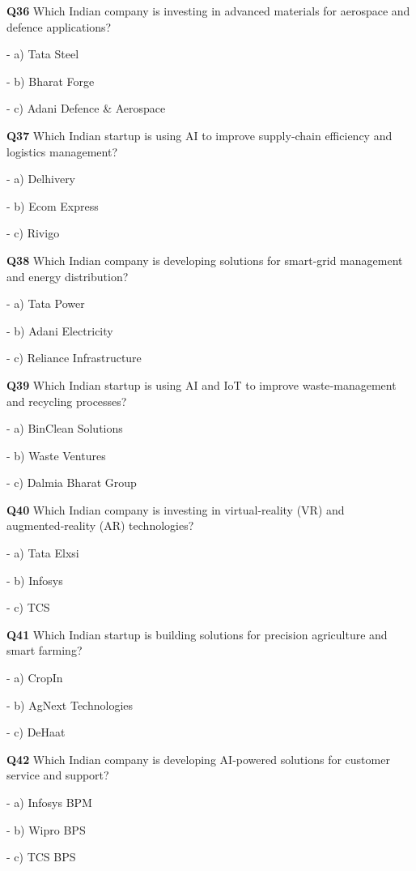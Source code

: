 \textbf{Q36} Which Indian company is investing in advanced materials for aerospace and defence applications?\par
\quad - a) Tata Steel\par
\quad - b) Bharat Forge\par
\quad - c) Adani Defence & Aerospace\par

\textbf{Q37} Which Indian startup is using AI to improve supply‑chain efficiency and logistics management?\par
\quad - a) Delhivery\par
\quad - b) Ecom Express\par
\quad - c) Rivigo\par

\textbf{Q38} Which Indian company is developing solutions for smart‑grid management and energy distribution?\par
\quad - a) Tata Power\par
\quad - b) Adani Electricity\par
\quad - c) Reliance Infrastructure\par

\textbf{Q39} Which Indian startup is using AI and IoT to improve waste‑management and recycling processes?\par
\quad - a) BinClean Solutions\par
\quad - b) Waste Ventures\par
\quad - c) Dalmia Bharat Group\par

\textbf{Q40} Which Indian company is investing in virtual‑reality (VR) and augmented‑reality (AR) technologies?\par
\quad - a) Tata Elxsi\par
\quad - b) Infosys\par
\quad - c) TCS\par

\textbf{Q41} Which Indian startup is building solutions for precision agriculture and smart farming?\par
\quad - a) CropIn\par
\quad - b) AgNext Technologies\par
\quad - c) DeHaat\par

\textbf{Q42} Which Indian company is developing AI‑powered solutions for customer service and support?\par
\quad - a) Infosys BPM\par
\quad - b) Wipro BPS\par
\quad - c) TCS BPS\par

